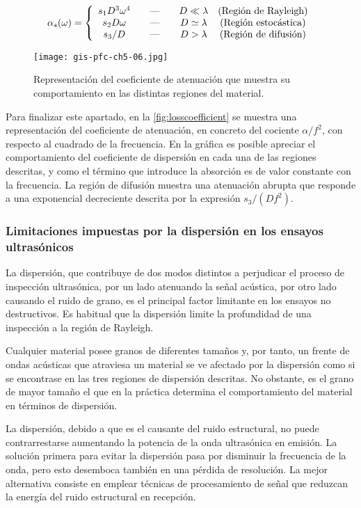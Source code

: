 {\setlength{\extrarowheight}{0.5ex}
\begin{equation}
	\alpha_s(\omega) = \left\{
	\begin{array}{c@{\qquad\text{---}\qquad}c@{\quad}c}
		s_1D^3\omega^4 & D\ll\lambda & \text{(Región de Rayleigh)} \\
		s_2D\omega & D\simeq\lambda & \text{(Región estocástica)} \\
		s_3/D & D>\lambda & \text{(Región de difusión)}
	\end{array}
	\right.
	\label{eq:dispersionlossreg}
\end{equation}}

\begin{figure}
	\begin{center}
		\texttt{[image: gis-pfc-ch5-06.jpg]}
	\end{center}
	\caption[Comportamiento del coeficiente de atenuación en las distintas regiones del medio]{Representación del coeficiente de atenuación que muestra su comportamiento en las distintas regiones del material.}
	\label{fig:losscoefficient}
\end{figure}

Para finalizar este apartado, en la \vref{fig:losscoefficient} se muestra una representación del coeficiente de atenuación, en concreto del cociente $\alpha/f^2$, con respecto al cuadrado de la frecuencia. En la gráfica es posible apreciar el comportamiento del coeficiente de dispersión en cada una de las regiones descritas, y como el término que introduce la absorción es de valor constante con la frecuencia. La región de difusión muestra una atenuación abrupta que responde a una exponencial decreciente descrita por la expresión $s_3/(Df^2)$.


\subsubsection{Limitaciones impuestas por la dispersión en los ensayos ultrasónicos}

La dispersión, que contribuye de dos modos distintos a perjudicar el proceso de inspección ultrasónica, por un lado atenuando la señal acústica, por otro lado causando el ruido de grano, es el principal factor limitante en los ensayos no destructivos. Es habitual que la dispersión limite la profundidad de una inspección a la región de Rayleigh.\par
Cualquier material posee granos de diferentes tamaños y, por tanto, un frente de ondas acústicas que atraviesa un material se ve afectado por la dispersión como si se encontrase en las tres regiones de dispersión descritas. No obstante, es el grano de mayor tamaño el que en la práctica determina el comportamiento del material en términos de dispersión.\par
La dispersión, debido a que es el causante del ruido estructural, no puede contrarrestarse aumentando la potencia de la onda ultrasónica en emisión. La solución primera para evitar la dispersión pasa por disminuir la frecuencia de la onda, pero esto desemboca también en una pérdida de resolución. La mejor alternativa consiste en emplear técnicas de procesamiento de señal que reduzcan la energía del ruido estructural en recepción.


